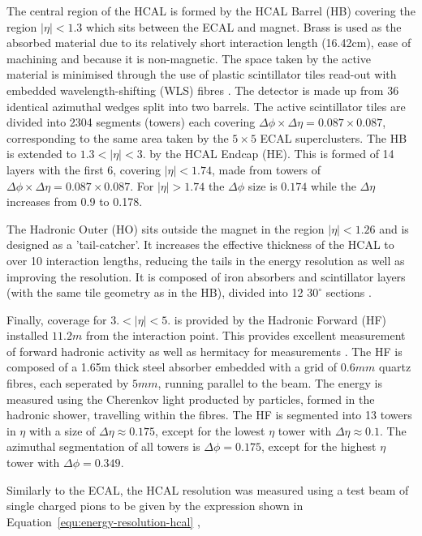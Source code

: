 The central region of the HCAL is formed by the HCAL Barrel (HB) covering the region $|\eta| < 1.3$ which sits between
the ECAL and magnet. Brass is used as the absorbed material due to its relatively short interaction length (16.42cm), ease of machining 
and because it is non-magnetic. The space taken by the active material is minimised through the use of plastic scintillator tiles
read-out with embedded wavelength-shifting (WLS) fibres \cite{CMS}. The detector is made up from 36 identical azimuthal wedges split into two barrels.
The active scintillator tiles are divided into 2304 segments (towers) each covering $\Delta\phi \times \Delta\eta = 0.087 × 0.087$, corresponding to the 
same area taken by the $5\times5$ ECAL superclusters. The HB is extended to $ 1.3 < |\eta| < 3.$ by the HCAL Endcap (HE). This is formed of 14 layers 
with the first 6, covering  $|\eta| < 1.74$, made from towers of $\Delta\phi \times \Delta\eta = 0.087 × 0.087$. For $|\eta| > 1.74$ the $\Delta\phi$
size is $0.174$ while the $\Delta\eta$ increases from 0.9 to 0.178.

The Hadronic Outer (HO) sits outside the magnet in the region $|\eta| < 1.26$ and is designed as a 'tail-catcher'.
It increases the effective thickness of the HCAL to over 10 interaction lengths, reducing the tails in the energy resolution
as well as improving the \met resolution. It is composed of iron absorbers and scintillator layers (with the same tile geometry as in the HB), divided into 
12 $30^\circ$ sections \cite{hcal_tdr}. 

Finally, coverage for $3. < |\eta| < 5.$ is provided by the Hadronic Forward (HF) installed $11.2 m$ from the interaction point. This provides
excellent measurement of forward hadronic activity as well as hermitacy for \met measurements \cite{hcal_tdr}. The HF is composed of a 1.65m thick steel absorber 
embedded with a grid of $0.6 mm$ quartz fibres, each seperated by $5mm$, running parallel to the beam. The energy is measured using the Cherenkov
light producted by particles, formed in the hadronic shower, travelling within the fibres. The HF is segmented into 13 towers in $\eta$ with a
size of $\Delta\eta \approx 0.175$, except for the lowest $\eta$ tower with $\Delta\eta \approx 0.1$. The azimuthal segmentation of all towers is 
$\Delta\phi = 0.175$, except for the highest $\eta$ tower with $\Delta\phi = 0.349$.

Similarly to the ECAL, the HCAL resolution was measured using a test beam of single charged pions to be given by the expression shown in Equation~\ref{equ:energy-resolution-hcal} 
\cite{hcal_performance},

